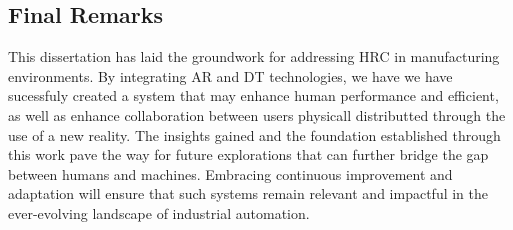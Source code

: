 \subsection{Final Remarks}

This dissertation has laid the groundwork for addressing \ac{HRC} in manufacturing environments. By integrating AR and DT technologies, we have we have sucessfuly created a system that may enhance human performance and efficient, as well as enhance collaboration between users physicall distributted through the use of a new reality. The insights gained and the foundation established through this work pave the way for future explorations that can further bridge the gap between humans and machines. Embracing continuous improvement and adaptation will ensure that such systems remain relevant and impactful in the ever-evolving landscape of industrial automation.